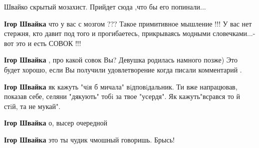 \begin{itemize}
\begin{itemize}
Швайко скрытый мозахист. Прийдет сюда ,что бы его попинали...

 
\textbf{Ігор Швайка} что у вас с мозгом ??? Такое примитивное мышление !!!
У вас нет стержня, кто давит под того и прогибаетесь, прикрываясь модными словечками...- вот это и есть СОВОК !!!

 
\textbf{Ігор Швайка} , про какой совок Вы? Девушка родилась намного позже)
Это будет хорошо, если Вы получили удовлетворение когда писали комментарий .

 
\textbf{Ігор Швайка} як кажуть "чiя б мичала" вiдповiдальник. Ти вже напрацював,
показав себе, селяни "дякують" тобi за твое "усердя". Як кажуть"всрався то й
стiй, та не мукай".

 
\textbf{Ігор Швайка} о, высер очередной

 
\textbf{Ігор Швайка} это ты чудик чмошный говоришь. Брысь!

 

\end{itemize}
\end{itemize}
